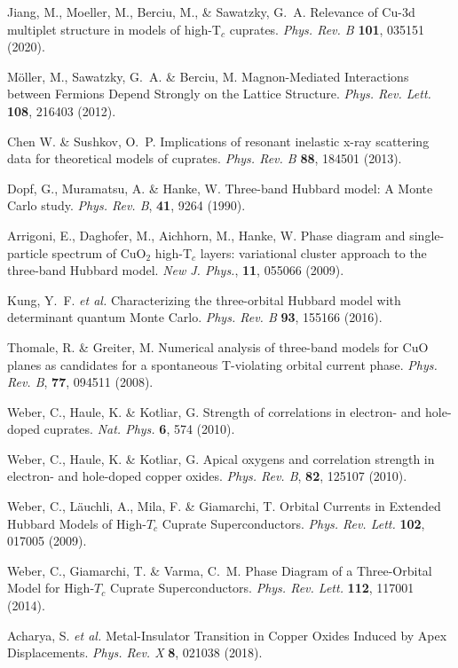 \documentclass[fleqn,twocolumn,11pt]{wlscirep}
\begin{document}
\begin{thebibliography}{99}
 Jiang, M., Moeller, M., Berciu, M., \& Sawatzky, G.~A. Relevance of Cu-3d multiplet structure in models of high-T$_c$ cuprates. \textit{Phys. Rev. B} {\bf 101}, 035151 (2020).

 M\"{o}ller, M., Sawatzky, G.~A. \& Berciu, M. Magnon-Mediated Interactions between Fermions Depend Strongly on the Lattice Structure. \textit{Phys. Rev. Lett.} {\bf 108}, 216403 (2012).

 Chen W. \& Sushkov, O.~P. Implications of resonant inelastic x-ray scattering data for theoretical models of cuprates.
 \textit{Phys. Rev. B} {\bf 88}, 184501 (2013).

Dopf, G., Muramatsu, A. \& Hanke, W. Three-band Hubbard model: A Monte Carlo study.
\textit{Phys. Rev. B}, {\bf 41}, 9264 (1990).

Arrigoni, E., Daghofer, M., Aichhorn, M., Hanke, W. 
Phase diagram and single-particle spectrum of CuO$_2$ high-T$_c$ layers: variational 
cluster approach to the three-band Hubbard model. 
\textit{New J. Phys.}, {\bf 11}, 055066 (2009).  

 Kung, Y.~F. \textit{et al.} Characterizing the three-orbital Hubbard model with determinant quantum Monte Carlo. \textit{Phys. Rev. B} {\bf 93}, 155166 (2016).


 Thomale, R. \& Greiter, M. Numerical analysis of three-band models for CuO planes as candidates for a spontaneous T-violating orbital current phase. \textit{Phys. Rev. B}, {\bf 77}, 094511 (2008).

 Weber, C., Haule, K. \& Kotliar, G. Strength of correlations in electron- and hole-doped cuprates. \textit{Nat. Phys.} {\bf 6}, 574 (2010).

 Weber, C., Haule, K. \& Kotliar, G. Apical oxygens and correlation strength in electron- and hole-doped copper oxides. \textit{Phys. Rev. B}, {\bf 82}, 125107 (2010).

 Weber, C., L\"{a}uchli, A., Mila, F. \& Giamarchi, T. Orbital Currents in Extended Hubbard Models of High-$T_c$ Cuprate Superconductors. \textit{Phys. Rev. Lett.} {\bf 102}, 017005 (2009).

 Weber, C., Giamarchi, T. \& Varma, C.~M. Phase Diagram of a Three-Orbital Model for High-$T_c$ Cuprate Superconductors. \textit{Phys. Rev. Lett.} {\bf 112}, 117001 (2014).

 Acharya, S. \textit{et al.} Metal-Insulator Transition in Copper Oxides Induced by Apex Displacements. \textit{Phys. Rev. X} {\bf 8}, 021038 (2018).


\end{thebibliography}
\end{document}

